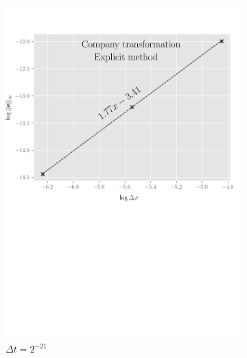 \begin{figure}[tbp]
  \centering
  \begin{subfigure}{0.4\textwidth}
    \centering
    \includegraphics[width=\textwidth]{chapters/chapter3/ConvergenceSpaceExplicitCompany.pdf}
    \caption{$\Delta{x}=2^{-7},\dots,2^{-10}$}
    \caption*{$\Delta{t}=2^{-21}$}
    \label{fig:finitedifferencesschemes:numericaresults:company_explicit_space}
  \end{subfigure}
  \hspace{0.5cm}
  \begin{subfigure}{0.4\textwidth}
    \centering

\end{subfigure}
\end{figure}
